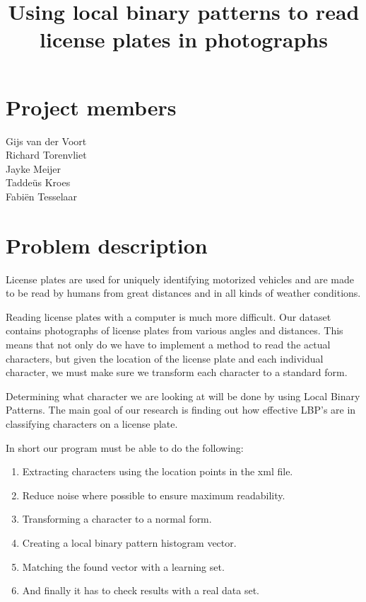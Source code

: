 \documentclass[a4paper]{article}
\title{Using local binary patterns to read license plates in photographs}
\begin{document}
\maketitle

\section*{Project members}
Gijs van der Voort\\
Richard Torenvliet\\
Jayke Meijer\\
Tadde\"us Kroes\\
Fabi\"en Tesselaar

\tableofcontents
\pagebreak

\setcounter{secnumdepth}{1}

\section{Problem description}

License plates are used for uniquely identifying motorized vehicles and are
made to be read by humans from great distances and in all kinds of weather
conditions.

Reading license plates with a computer is much more difficult. Our dataset
contains photographs of license plates from various angles and distances. This
means that not only do we have to implement a method to read the actual
characters, but given the location of the license plate and each individual
character, we must make sure we transform each character to a standard form. 

Determining what character we are looking at will be done by using Local Binary
Patterns. The main goal of our research is finding out how effective LBP's are
in classifying characters on a license plate.

In short our program must be able to do the following:

\begin{enumerate}
    \item Extracting characters using the location points in the xml file.
    \item Reduce noise where possible to ensure maximum readability.
    \item Transforming a character to a normal form.
    \item Creating a local binary pattern histogram vector.
    \item Matching the found vector with a learning set.
    \item And finally it has to check results with a real data set.
\end{enumerate}
\end{document}
